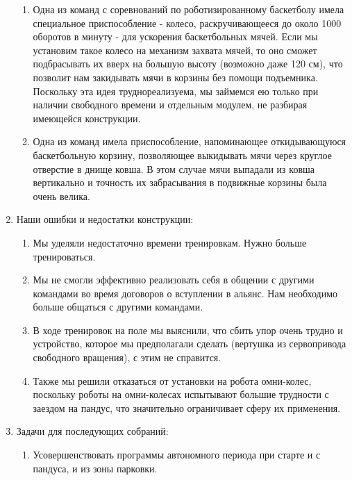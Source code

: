 \begin{enumerate}
\begin{enumerate}
	\item Одна из команд с соревнований по роботизированному баскетболу имела специальное приспособление - колесо, раскручивающееся до около 1000 оборотов в минуту - для ускорения баскетбольных мячей. Если мы установим такое колесо на механизм захвата мячей, то оно сможет подбрасывать их вверх на большую высоту (возможно даже 120 см), что позволит нам закидывать мячи в корзины без помощи подъемника. Поскольку эта идея труднореализуема, мы займемся ею только при наличии свободного времени и отдельным модулем, не разбирая имеющейся конструкции.
	
	\item Одна из команд имела приспособление, напоминающее откидывающуюся баскетбольную корзину, позволяющее выкидывать мячи через круглое отверстие в днище ковша. В этом случае мячи выпадали из ковша вертикально и точность их забрасывания в подвижные корзины была очень велика.
	
  \end{enumerate}
  
  \item Наши ошибки и недостатки конструкции:
  \begin{enumerate}
  	\item Мы уделяли недостаточно времени тренировкам. Нужно больше тренироваться.
  	
  	\item Мы не смогли эффективно реализовать себя в общении с другими командами во время договоров о вступлении в альянс. Нам необходимо больше общаться с другими командами.
  	
  	\item В ходе тренировок на поле мы выяснили, что сбить упор очень трудно и устройство, которое мы предполагали сделать (вертушка из сервопривода свободного вращения), с этим не справится.
  	
  	\item Также мы решили отказаться от установки на робота омни-колес, поскольку роботы на омни-колесах испытывают большие трудности с заездом на пандус, что значительно ограничивает сферу их применения.
  	
  \end{enumerate}
  
  \item Задачи для последующих собраний:
  \begin{enumerate}
  	\item Усовершенствовать программы автономного периода при старте и с пандуса, и из зоны парковки.
  	

\end{enumerate}
\end{enumerate}
